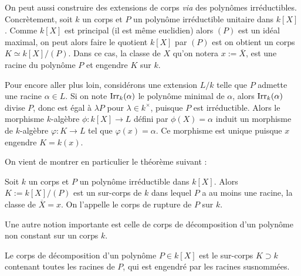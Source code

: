 \documentclass[a4paper]{article} %
\numberwithin{equation}{section}
\newcommand\Irr[2]{\textup{Irr}_{#1}(#2)}
\begin{document}
On peut aussi construire des extensions de corps \textit{via} des polynômes 
irréductibles. Concrètement, soit $k$ un corps et $P$ un polynôme irréductible 
unitaire dans $k[X]$. Comme $k[X]$ est principal (il est même euclidien) alors 
$(P)$ est un idéal maximal, on peut alors faire le quotient $k[X]$ par $(P)$ 
est on obtient un corps $K \simeq k[X]/(P)$. Dans ce cas, la classe de $X$ qu'on 
notera $x := \overline{X}$, est une racine du polynôme $P$ et engendre $K$ sur 
$k$.\par
Pour encore aller plus loin, considérons une extension $L/k$ telle que $P$ 
admette une racine $\alpha\in L$. Si on note $\Irr{k}{\alpha}$ le polynôme 
minimal de $\alpha$, alors $\Irr{k}{\alpha}$ divise $P$, donc est égal à 
$\lambda P$ pour $\lambda\in k^{\times}$, puisque $P$ est irréductible. Alors 
le morphisme $k$-algèbre $\phi : k[X] \to L$ défini par $\phi(X) = \alpha$ 
induit un morphisme de $k$-algèbre $\varphi : K \to L$ tel que $\varphi(x) 
= \alpha$. Ce morphisme est unique puisque $x$ engendre $K = k(x)$.\\\par
On vient de montrer en particulier le théorème suivant :

\begin{thm}
Soit $k$ un corps et $P$ un polynôme irréductible dans $k[X]$. Alors $K := 
k[X]/(P)$ est un sur-corps de $k$ dans lequel $P$ a au moins une racine, la 
classe de $\overline{X} = x$. On l'appelle le corps de rupture de $P$ sur 
$k$.\par
\end{thm}

Une autre notion importante est celle de corps de décomposition d'un polynôme 
non constant sur un corps $k$.

\begin{defn}
\label{defdec}
Le corps de décomposition d'un polynôme $P\in k[X]$ est le sur-corps $K \supset k$ 
contenant toutes les racines de $P$, qui est engendré par les racines susnommées.
\end{defn}
\end{document}
